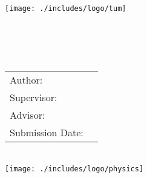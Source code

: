 \begin{titlepage}
\centering
\vspace{40mm}
\texttt{[image: ./includes/logo/tum]} \\
\vspace{5mm}
{\huge\MakeUppercase{\getFacultyger{}}}\\
\vspace{5mm}
{\large\MakeUppercase{\getUniversity{}}}\\
\vspace{20mm}
{\Large \getDoctype{}} \\
\vspace{15mm}
{\huge\bfseries \getTitleger{}} \\
\vspace{15mm}
\begin{tabular}{l l}
Author: & \getAuthor{} \\
Supervisor: & \getSupervisor{} \\
Advisor: & \getAdvisor{} \\
Submission Date: & \getSubmissionDate{} \\
\end{tabular}
\vspace{20mm} \\
\texttt{[image: ./includes/logo/physics]}
\end{titlepage}